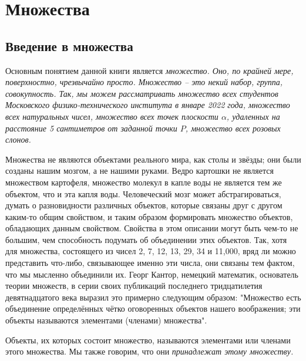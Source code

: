 \documentclass[a5paper, 10pt]{extreport}
\begin{document}
\chapter{Множества}

\section{Введение в множества}

Основным понятием данной книги является \itshape множество\normalfont{}. Оно, по крайней мере, поверхностно, чрезвычайно просто. Множество -- это некий набор, группа, совокупность. Так, мы можем рассматривать множество всех студентов Московского физико-технического института в январе 2022 года, множество всех натуральных чисел, множество всех точек плоскости $\alpha$, удаленных на расстояние 5 сантиметров от заданной точки $P$, множество всех розовых слонов. \par
Множества не являются объектами реального мира, как столы и звёзды; они были созданы нашим мозгом, а не нашими руками. Ведро картошки не является множеством картофеля, множество молекул в капле воды не является тем же объектом, что и эта капля воды. Человеческий мозг может абстрагироваться, думать о разновидности различных объектов, которые связаны друг с другом каким-то общим свойством, и таким образом формировать множество объектов, обладающих данным свойством. Свойства в этом описании могут быть чем-то не большим, чем способность подумать об объединении этих объектов. Так, хотя для множества, состоящего из чисел 2, 7, 12, 13, 29, 34 и 11,000, вряд ли можно представить что-либо, связывающее именно эти числа, они связаны тем фактом, что мы мысленно объединили их. Георг Кантор, немецкий математик, основатель теории множеств, в серии своих публикаций последнего тридцатилетия девятнадцатого века выразил это примерно следующим образом: "Множество есть объединение определённых чётко оговоренных объектов нашего воображения; эти объекты называются элементами (членами) множества". \par
Объекты, их которых состоит множество, называются элементами или членами этого множества. Мы также говорим, что они \itshape принадлежат\normalfont{} этому множеству. \par
\end{document}

